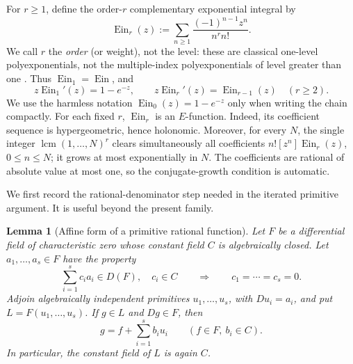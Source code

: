 \documentclass[11pt]{article}
\newtheorem{lemma}[theorem]{Lemma}
\theoremstyle{definition}
\theoremstyle{remark}
\newcommand{\Ein}{\operatorname{Ein}}
\newcommand{\EinDepth}[1]{\operatorname{Ein}_{#1}}
\begin{document}
For \(r\geq1\), define the order-\(r\) complementary exponential
integral by
\begin{equation}\label{eq:ein-depth-definition}
 \EinDepth{r}(z)
 :=\sum_{n\geq1}\frac{(-1)^{n-1}z^n}{n^r n!}.
\end{equation}
We call \(r\) the \emph{order} (or weight), not the level: these are
classical one-level polyexponentials, not the multiple-index
polyexponentials of level greater than one
\cite{Hardy1905PartII,Boyadzhiev2007,AminovArnaudo2026}.
Thus \(\EinDepth{1}=\Ein\), and
\begin{equation}\label{eq:ein-depth-chain}
 z\EinDepth{1}'(z)=1-e^{-z},\qquad
 z\EinDepth{r}'(z)=\EinDepth{r-1}(z)\quad(r\geq2).
\end{equation}
We use the harmless notation
\(\EinDepth{0}(z)=1-e^{-z}\)
only when writing the chain compactly.  For each fixed \(r\),
\(\EinDepth{r}\) is an \(E\)-function.  Indeed, its coefficient sequence
is hypergeometric, hence holonomic.  Moreover, for every \(N\), the single
integer \(\operatorname{lcm}(1,\ldots,N)^r\) clears simultaneously all
coefficients \(n![z^n]\EinDepth{r}(z)\), \(0\leq n\leq N\); it grows at
most exponentially in \(N\).  The coefficients are rational of absolute
value at most one, so the conjugate-growth condition is automatic.

We first record the rational-denominator step needed in the iterated
primitive argument.  It is useful beyond the present family.

\begin{lemma}[Affine form of a primitive rational function]
\label{lem:depth-affine-primitive}
Let \(F\) be a differential field of characteristic zero whose constant
field \(C\) is algebraically closed.  Let
\(a_1,\ldots,a_s\in F\) have the property
\begin{equation}\label{eq:depth-no-base-exact-combination}
 \sum_{i=1}^s c_i a_i\in D(F),\quad c_i\in C
 \qquad\Longrightarrow\qquad c_1=\cdots=c_s=0.
\end{equation}
Adjoin algebraically independent primitives
\(u_1,\ldots,u_s\), with \(Du_i=a_i\), and put
\(L=F(u_1,\ldots,u_s)\).  If \(g\in L\) and \(Dg\in F\), then
\begin{equation}\label{eq:depth-affine-conclusion}
 g=f+\sum_{i=1}^s b_i u_i
 \qquad(f\in F,\ b_i\in C).
\end{equation}
In particular, the constant field of \(L\) is again \(C\).
\end{lemma}
\end{document}
